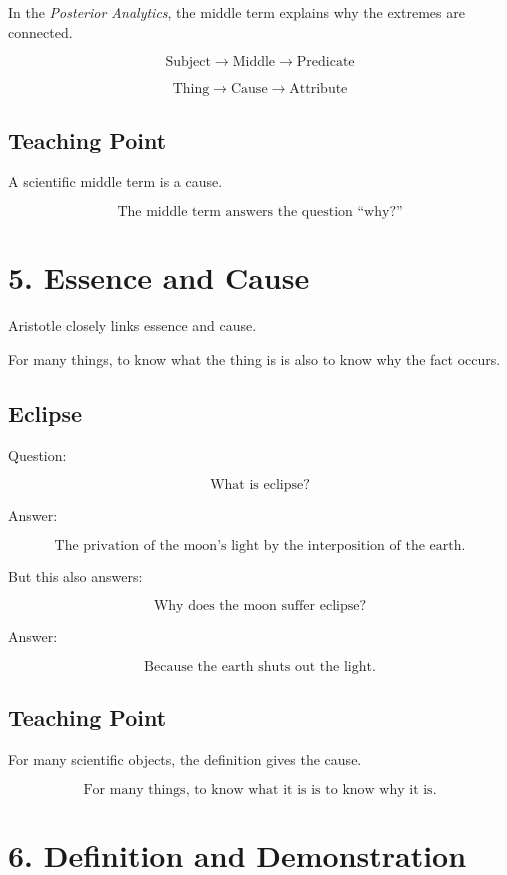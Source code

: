 \documentclass[12pt]{article}
\begin{document}
In the \textit{Posterior Analytics}, the middle term explains why the extremes
are connected.

\[
\text{Subject} \rightarrow \text{Middle} \rightarrow \text{Predicate}
\]

\[
\text{Thing} \rightarrow \text{Cause} \rightarrow \text{Attribute}
\]

\subsection*{Teaching Point}

A scientific middle term is a cause.

\[
\boxed{
\text{The middle term answers the question ``why?''}
}
\]

\section*{5. Essence and Cause}

Aristotle closely links essence and cause.

For many things, to know what the thing is is also to know why the fact occurs.

\subsection*{Eclipse}

Question:

\[
\text{What is eclipse?}
\]

Answer:

\[
\text{The privation of the moon's light by the interposition of the earth.}
\]

But this also answers:

\[
\text{Why does the moon suffer eclipse?}
\]

Answer:

\[
\text{Because the earth shuts out the light.}
\]

\subsection*{Teaching Point}

For many scientific objects, the definition gives the cause.

\[
\boxed{
\text{For many things, to know what it is is to know why it is.}
}
\]

\section*{6. Definition and Demonstration}
\end{document}
